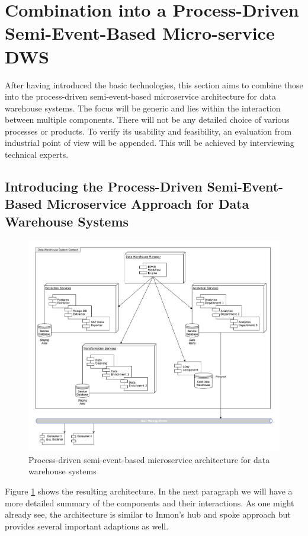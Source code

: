 \section{Combination into a Process-Driven Semi-Event-Based Micro-service DWS}
\label{sec:finalArchitecture}
After having introduced the basic technologies, this section aims to combine those into the process-driven semi-event-based microservice architecture for data warehouse systems. The focus will be generic and lies within the interaction between multiple components. There will not be any detailed choice of various processes or products. To verify its usability and feasibility, an evaluation from industrial point of view will be appended. This will be achieved by interviewing technical experts.

\subsection{Introducing the Process-Driven Semi-Event-Based Microservice Approach for Data Warehouse Systems}
\begin{figure}[!htb]
    \centering
    \includegraphics[scale=0.43]{pictures/ResultingArchitecture.png}
    \caption{Process-driven semi-event-based microservice architecture for data warehouse systems}
    \label{fig:resultingArch}
\end{figure}
Figure \ref{fig:resultingArch} shows the resulting architecture. In the next paragraph we will have a more detailed summary of the components and their interactions. As one might already see, the architecture is similar to Inmon's hub and spoke approach but provides several important adaptions as well. \newline
